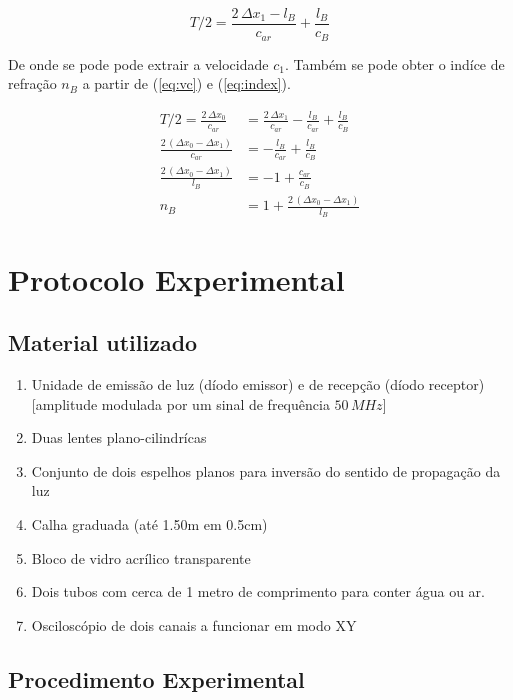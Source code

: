 \documentclass[a4paper,12pt]{article}      %
\begin{document}
\begin{equation}
	\label{eq:vc_bloco}
	{T/2}  = \frac{2\,\Delta x_1 - l_B}{c_{ar}}  +  \frac{l_B}{c_{B}}
\end{equation}

De onde se pode pode extrair a velocidade $c_{1}$. 
Também se pode obter  o indíce de refração $n_{B}$ a partir de (\ref{eq:vc}) e (\ref{eq:index}).

\begin{align}
	\label{eq:n_bloco}
	{T/2}  = \frac{2\,\Delta x_0}{c_{ar}}  &=  \frac{2\,\Delta x_1 }{c_{ar}} -   \frac{l_B}{c_{ar}}  +  \frac{l_B}{c_{B}} \nonumber \\ 
	\frac{2\,(\Delta x_0- \Delta x_1 )}{c_{ar}}  &= -   \frac{l_B}{c_{ar}}  +  \frac{l_B}{c_{B}} \nonumber \\
	\frac{2\,(\Delta x_0- \Delta x_1 )}{l_B} &= -1 +  \frac{c_{ar}}{c_{B}} \nonumber \\
	n_{B} &= 1 +  \frac{2\,(\Delta x_0- \Delta x_1 )}{l_B}
\end{align}

\newpage
\section{\sf Protocolo Experimental}
\subsection{\sf Material utilizado}

\begin{enumerate}
\setlength{\itemsep}{0mm}
\item Unidade de emissão de luz (díodo emissor) e de recepção (díodo receptor)
[amplitude modulada por um sinal de frequência $50\,MHz$] 
\item Duas lentes plano-cilindrícas
\item Conjunto de dois espelhos planos para inversão do sentido de propagação da luz 
\item Calha graduada (até 1.50m em 0.5cm) 
\item Bloco de vidro acrílico transparente 
\item Dois tubos com cerca de 1 metro de comprimento para conter água ou ar. 
\item Osciloscópio de dois canais a funcionar em modo XY
\end{enumerate}

\subsection{\sf Procedimento Experimental}
\end{document}
